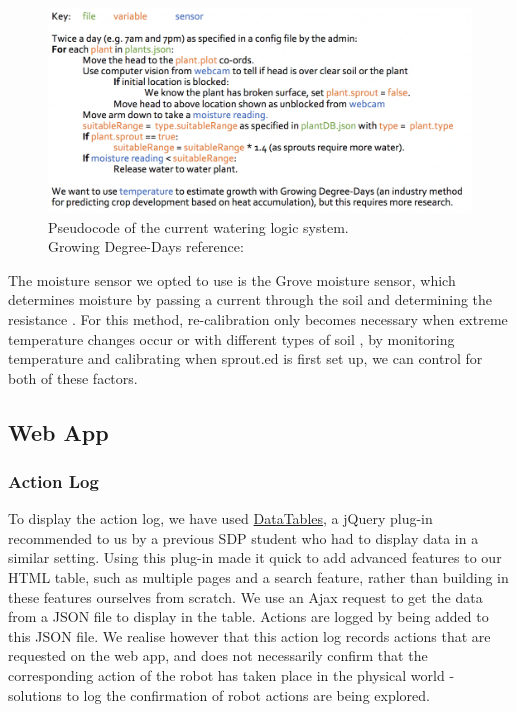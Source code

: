\documentclass{article}
\begin{document}
\begin{figure}[h]
\begin{center}

\includegraphics[width=1.075\linewidth]{figs-demo3/pseudoCode.png}

\caption{Pseudocode of the current watering logic system. \\ Growing Degree-Days reference: \cite{MSU}}
\label{fig:pseudocode}
\end{center}
\vskip -4mm
\end{figure} 

The moisture sensor we opted to use is the Grove moisture sensor, which determines moisture by passing a current through the soil and determining the resistance \cite{GMS}. For this method, re-calibration only becomes necessary when extreme temperature changes occur or with different types of soil \cite{MDPI}, by monitoring temperature and calibrating when sprout.ed is first set up, we can control for both of these factors. 

\subsection{Web App}

\subsubsection{Action Log}

To display the action log, we have used \href{https://datatables.net/}{DataTables}, a jQuery plug-in recommended to us by a previous SDP student who had to display data in a similar setting. Using this plug-in made it quick to add advanced features to our HTML table, such as multiple pages and a search feature, rather than building in these features ourselves from scratch. We use an Ajax request to get the data from a JSON file to display in the table. Actions are logged by being added to this JSON file. We realise however that this action log records actions that are requested on the web app, and does not necessarily confirm that the corresponding action of the robot has taken place in the physical world - solutions to log the confirmation of robot actions are being explored.
\end{document}
